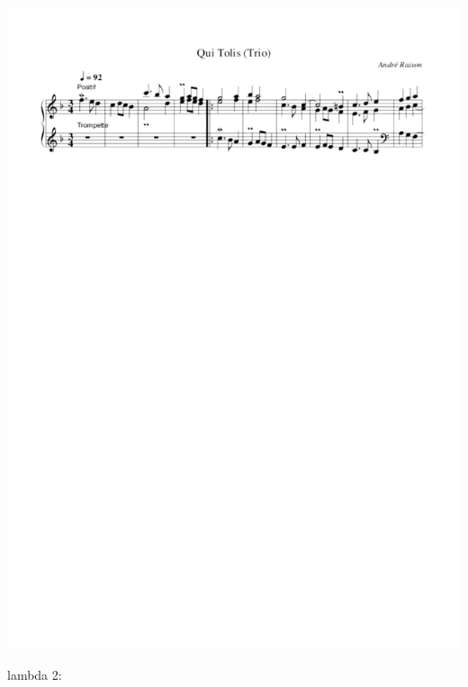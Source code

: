 \documentclass[]{article}
\begin{document}
\includegraphics{../abc-images/d0fafff6e3eb537341f5d5eea7c29e2bc41ccc38.pdf}

lambda 2:
\end{document}
